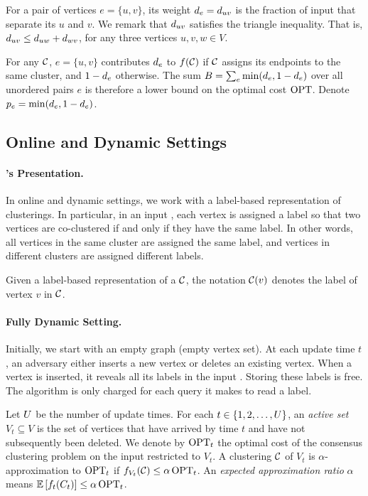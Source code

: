 For a pair of vertices $ e=\{u,v\} $, its weight $ \weight{e}= \weight{uv} $ is the fraction of input \clusterings that separate its $ u $ and $ v $.
We remark that $ \weight{uv} $ satisfies the triangle inequality.
That is, $ \weight{uv} \leq \weight{uw} + \weight{wv} $, for any three vertices $ u,v,w \in V $.

For any \clustering $ \mathcal{C} $, $ e = \{ u,v \} $ contributes $ \weight{e} $ to $ f(\mathcal{C}) $ if $ \mathcal{C} $ assigns its endpoints to the same cluster, and $ 1- \weight{e} $ otherwise.
The sum $ \summweight = \sum_{e} \min(\weight{e}, 1-\weight{e}) $ over all unordered pairs $ e $ is therefore a lower bound on the optimal cost $ \operatorname{OPT} $.
Denote $ \mweight{e} = \min(\weight{e}, 1-\weight{e}) $.

\subsection{Online and Dynamic Settings}\label{sub:online_and_dynamic_settings} %
\paragraph{\texorpdfstring{\Clusterings}{Clusterings}'s Presentation.}
In online and dynamic settings, we work with a label-based representation of clusterings.
In particular, in an input \clustering, each vertex is assigned a label so that two vertices are co-clustered if and only if they have the same label.
In other words, all vertices in the same cluster are assigned the same label, and vertices in different clusters are assigned different labels.

Given a label-based representation of a \clustering $ \mathcal{C} $, the notation $ \mathcal{C}(v) $ denotes the label of vertex $ v $ in $ \mathcal{C} $.

\paragraph{Fully Dynamic Setting.}\label{par:fully_dynamic_setting} %
Initially, we start with an empty graph (empty vertex set).
At each update time $ t $, an adversary either inserts a new vertex or deletes an existing vertex.
When a vertex is inserted, it reveals all its labels in the input \clusterings.
Storing these labels is free.
The algorithm is only charged for each query it makes to read a label.

Let $ U $ be the number of update times.
For each $ t\in \{ 1,2, \dots, U \} $, an \emph{active set} $ V_t \subseteq V $ is the set of vertices that have arrived by time $ t $ and have not subsequently been deleted.
We denote by $ \operatorname{OPT}_t $ the optimal cost of the consensus clustering problem on the input \clusterings restricted to $ V_t $.
A clustering $ \mathcal{C} $ of $ V_t $ is $ \alpha $-approximation to $ \operatorname{OPT}_t $ if $ f_{V_{t}}(\mathcal{C}) \leq \alpha \operatorname{OPT}_{t} $.
An \emph{expected approximation ratio} $\alpha$ means $\expt{\cost_{t}(C_t)}\le\alpha\OPT_t$. 

